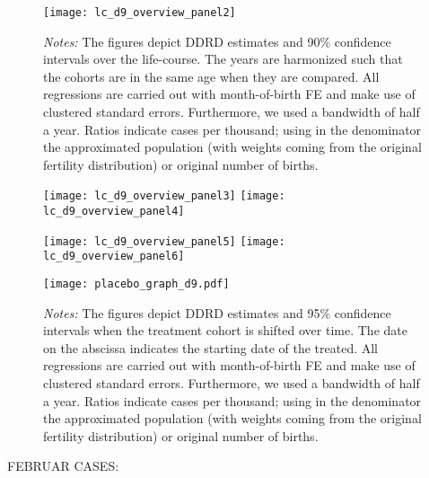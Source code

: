 \begin{landscape}
\begin{figure}[H]
\centering
\begin{minipage}{.9\linewidth}
\texttt{[image: lc\_d9\_overview\_panel2]}
{\scriptsize \emph{Notes:} The figures depict DDRD estimates and 90\% confidence intervals over the life-course. The years are harmonized such that the cohorts are in the same age when they are compared. All regressions are carried out with month-of-birth FE and make use of clustered standard errors. Furthermore, we used a bandwidth of half a year. Ratios indicate cases per thousand; using in the denominator the approximated population (with weights coming from the original fertility distribution) or original number of births. \par}
\end{minipage}
\end{figure}
\end{landscape}
\begin{figure}[H]%
	\centering
	\texttt{[image: lc\_d9\_overview\_panel3]}
	\texttt{[image: lc\_d9\_overview\_panel4]}
\end{figure}
\begin{figure}[H]
	\centering	
	\texttt{[image: lc\_d9\_overview\_panel5]}
	\texttt{[image: lc\_d9\_overview\_panel6]}
\end{figure}

\newpage
\begin{landscape}
\begin{figure}[H]
	\centering
    \begin{minipage}{.9\linewidth}
	\texttt{[image: placebo\_graph\_d9.pdf]}
    {\scriptsize \emph{Notes:} The figures depict DDRD estimates and 95\% confidence intervals when the treatment cohort is shifted over time. The date on the abscissa indicates the starting date of the treated.  All regressions are carried out with month-of-birth FE and make use of clustered standard errors. Furthermore, we used a bandwidth of half a year. Ratios indicate cases per thousand; using in the denominator the approximated population (with weights coming from the original fertility distribution) or original number of births. \par}
    \end{minipage}
\end{figure}
\end{landscape}



\begin{landscape}

\end{landscape}
\begin{landscape}

\end{landscape}
\newpage
FEBRUAR CASES:


